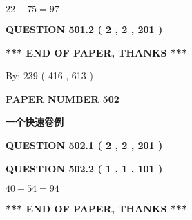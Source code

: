 \documentclass{ctexart}
\begin{document}
  
 
 

$ %
22 +  %
75=   %
97$
 
 
  
\vspace{0.2in}
  
{\textbf{\Large{QUESTION
501.2 
 ( 2 , 2 , 201 )
}}}
  
  
   
   
 \vspace{0.2in}
 
   
   
   
   
\vspace{1.0in} 
{\textbf{\large{ *** END OF PAPER, THANKS *** }}} 
   
   
\hspace{1.0in} By: 
 239 ( 416 ,  613 )
   
   
   
   
\newpage 
\setcounter{page}{ 
   502001 } 
   
   
   
   
 {\textbf{ \Large{ PAPER NUMBER  502  }}}
   
   
\vspace{0.2in}
   
   
   
   
   
   
 \vspace{0.2in}
{\LARGE {\textbf{ 一个快速卷例}}}
   
   
  
\vspace{0.2in}
  
{\textbf{\Large{QUESTION
502.1 
 ( 2 , 2 , 201 )
}}}
  
  
  
\vspace{0.2in}
  
{\textbf{\Large{QUESTION
502.2 
 ( 1 , 1 , 101 )
}}}
  
  
 
 

$ %
40 +  %
54=   %
94$
 
 
   
   
 \vspace{0.2in}
 
   
   
   
   
\vspace{1.0in} 
{\textbf{\large{ *** END OF PAPER, THANKS *** }}} 
   
\end{document}
